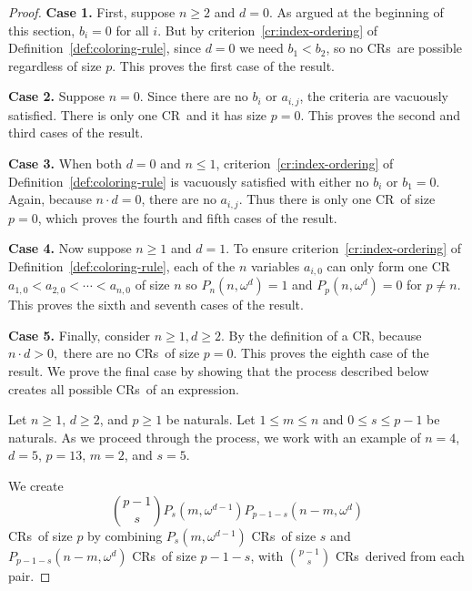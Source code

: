 \documentclass[11pt]{article}
\newcommand{\om}{\omega}
\newcommand{\crulenospace}{CR}
\newcommand{\crule}{\crulenospace~}
\newcommand{\crules}{\crulenospace s~}
\newcommand{\case}[1]{\textbf{Case #1.}}
\newcommand{\numpoints}{n}
\newcommand{\inumpoints}{i}
\newcommand{\idegr}{j}
\newcommand{\commonconst}{a}
\newcommand{\rareconst}{b}
\theoremstyle{plain}
\theoremstyle{definition}
\begin{document}
\begin{proof}

\case{1} First, suppose $\numpoints \geq 2$ and $d = 0$. As argued at the beginning of this section, $\rareconst_{\inumpoints}= 0$ for all $\inumpoints$. But by criterion~\ref{cr:index-ordering} of Definition~\ref{def:coloring-rule}, since $d = 0$ we need $\rareconst_1 < \rareconst_2$, so no \crules are possible regardless of size $p$. This proves the first case of the result.

\case{2} Suppose $\numpoints = 0$. 
Since there are no $\rareconst_{\inumpoints}$ or $\commonconst_{\inumpoints,\idegr}$, the criteria are vacuously satisfied. There is only one \crule and it has size $p = 0$. This proves the second and third cases of the result.

\case{3} When both $d = 0$ and $\numpoints \leq 1$, 
criterion~\ref{cr:index-ordering} of Definition~\ref{def:coloring-rule} is
vacuously satisfied with either no $\rareconst_{\inumpoints}$ or $\rareconst_1 = 0$. Again, because $\numpoints \cdot d = 0$, there are no $\commonconst_{\inumpoints,\idegr}$. Thus there is only one \crule of size $p=0$, which proves the fourth and fifth cases of the result.

\case{4} Now suppose $\numpoints \geq 1$ and $d = 1$. To ensure criterion~\ref{cr:index-ordering} of Definition~\ref{def:coloring-rule}, each of the $\numpoints$ variables $\commonconst_{\inumpoints,0}$ can only form one \crule $\commonconst_{1,0} < \commonconst_{2,0} < \cdots < \commonconst_{\numpoints,0}$ of size $\numpoints$ so $P_{\numpoints}\left(\numpoints, \om^d\right) = 1$ and $P_p\left(\numpoints, \om^d\right) = 0$ for $p \neq \numpoints$. This proves the sixth and seventh cases of the result.

\case{5} Finally, consider $\numpoints \geq 1, d \geq 2$. By the definition of a \crulenospace, because $\numpoints \cdot d > 0,$ there are no \crules of size $p=0.$ This proves the eighth
case of the result.
We prove the final case by showing that the process described below creates all possible \crules of an expression.

Let $\numpoints \geq 1$, $d \geq 2$, and $p \geq 1$ be naturals. Let $1 \leq m \leq \numpoints$ and $0 \leq s \leq p-1$ be naturals. As we proceed through the process, we work with an example of $\numpoints = 4$, $d = 5$, $p=13$, $m=2$, and $s=5$.

We create $$\binom{p-1}{s} P_s \left( m,\om^{d-1} \right) P_{p-1-s} \left( \numpoints-m,\om^d \right)$$ \crules of size $p$ by combining $P_s \left( m,\om^{d-1} \right)$ \crules of size $s$ and $P_{p-1-s} \left( \numpoints-m,\om^d \right)$ \crules of size $p-1-s$, with $\binom{p-1}{s}$ \crules derived from each pair.


\end{proof}
\end{document}
